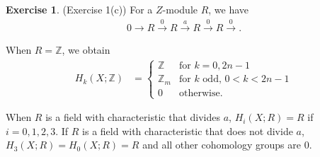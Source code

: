 \documentclass[12pt, psamsfonts]{amsart}
\theoremstyle{definition}
\newtheorem*{exer}{Exercise}
\theoremstyle{remark}
\numberwithin{equation}{section}
\begin{document}
\begin{exer}{(Exercise 1(c))}
  For a $Z$-module $R$, we have
  \begin{align*}
    0 \rightarrow R \xrightarrow{0} R \xrightarrow{a} R \xrightarrow{0} R \xrightarrow 0.
  \end{align*}

  When $R = \mathbb{Z}$, we obtain
  \begin{align*}
    H_k(X; \mathbb{Z}) &= \begin{cases}
      \mathbb{Z} & \text{for $k = 0, 2n - 1$} \\
      \mathbb{Z}_m & \text{for $k$ odd, $0 < k < 2n - 1$} \\
      0 & \text{otherwise}.
    \end{cases}
  \end{align*}

  When $R$ is a field with characteristic that divides $a$, $H_i(X; R) = R$ if $i = 0, 1, 2, 3$.
  If $R$ is a field with characteristic that does not divide $a$, $H_3(X; R) = H_0(X; R) = R$ and all other cohomology groups are 0.
\end{exer}
\end{document}
